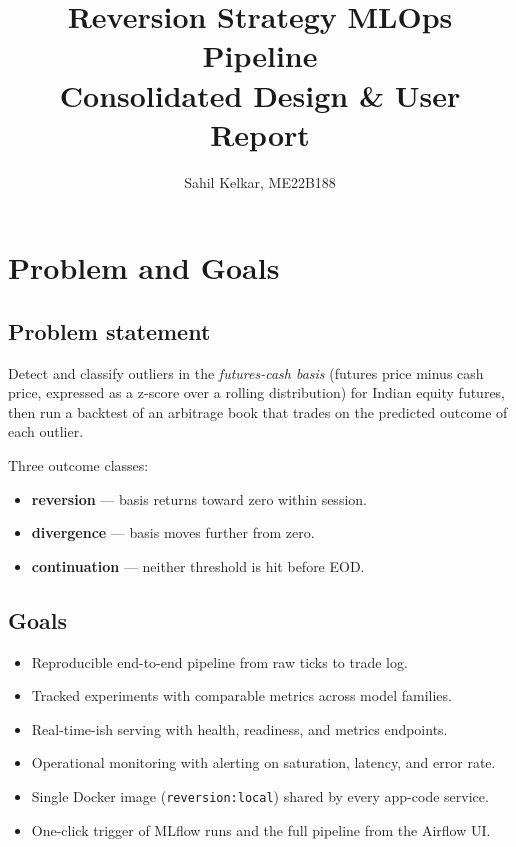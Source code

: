\documentclass[11pt,a4paper]{article}
\title{Reversion Strategy MLOps Pipeline\\\large{Consolidated Design \& User Report}}
\author{Sahil Kelkar, ME22B188}
\date{}
\begin{document}
\maketitle
\vspace{-2em}

\tableofcontents
\newpage

\section{Problem and Goals}

\subsection{Problem statement}
Detect and classify outliers in the \emph{futures-cash basis} (futures price minus cash price, expressed as a z-score over a rolling distribution) for Indian equity futures, then run a backtest of an arbitrage book that trades on the predicted outcome of each outlier.

Three outcome classes:
\begin{itemize}[leftmargin=1.5em,itemsep=0pt]
  \item \textbf{reversion} --- basis returns toward zero within session.
  \item \textbf{divergence} --- basis moves further from zero.
  \item \textbf{continuation} --- neither threshold is hit before EOD.
\end{itemize}

\subsection{Goals}
\begin{itemize}[leftmargin=1.5em,itemsep=0pt]
  \item Reproducible end-to-end pipeline from raw ticks to trade log.
  \item Tracked experiments with comparable metrics across model families.
  \item Real-time-ish serving with health, readiness, and metrics endpoints.
  \item Operational monitoring with alerting on saturation, latency, and error rate.
  \item Single Docker image (\texttt{reversion:local}) shared by every app-code service.
  \item One-click trigger of MLflow runs and the full pipeline from the Airflow UI.
\end{itemize}
\end{document}
